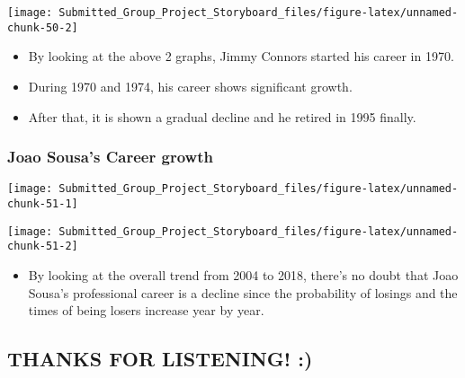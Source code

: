 \documentclass[]{article}
\providecommand{\tightlist}{%
  \setlength{\itemsep}{0pt}\setlength{\parskip}{0pt}}
\begin{document}
\begin{center}\texttt{[image: Submitted\_Group\_Project\_Storyboard\_files/figure-latex/unnamed-chunk-50-2]} \end{center}

\begin{itemize}
\tightlist
\item
  By looking at the above 2 graphs, Jimmy Connors started his career in
  1970.
\item
  During 1970 and 1974, his career shows significant growth.
\item
  After that, it is shown a gradual decline and he retired in 1995
  finally.
\end{itemize}

\subsubsection{Joao Sousa's Career
growth}\label{joao-sousas-career-growth}

\begin{center}\texttt{[image: Submitted\_Group\_Project\_Storyboard\_files/figure-latex/unnamed-chunk-51-1]} \end{center}

\begin{center}\texttt{[image: Submitted\_Group\_Project\_Storyboard\_files/figure-latex/unnamed-chunk-51-2]} \end{center}

\begin{itemize}
\tightlist
\item
  By looking at the overall trend from 2004 to 2018, there's no doubt
  that Joao Sousa's professional career is a decline since the
  probability of losings and the times of being losers increase year by
  year.
\end{itemize}

\subsection{THANKS FOR LISTENING! :)}\label{thanks-for-listening}
\end{document}
